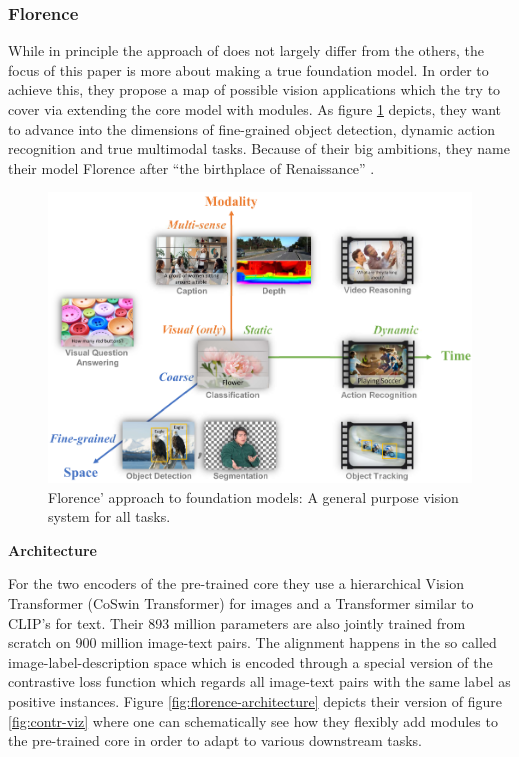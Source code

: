 \documentclass[
]{krantz}
\begin{document}
\hypertarget{florence}{%
\subsubsection{Florence}\label{florence}}

While in principle the approach of \citet{yuan2021florence} does not largely differ from the others, the focus of this paper is more about making a true foundation model.
In order to achieve this, they propose a map of possible vision applications which the try to cover via extending the core model with modules.
As figure \ref{fig:florence-dimensions} depicts, they want to advance into the dimensions of fine-grained object detection, dynamic action recognition and true multimodal tasks.
Because of their big ambitions, they name their model Florence after ``the birthplace of Renaissance'' \citep{yuan2021florence}.

\begin{figure}

{\centering \includegraphics[width=1\linewidth]{figures/02-04-text-support-img/florence-dimensions} 

}

\caption{Florence' approach to foundation models: A general purpose vision system for all tasks.}\label{fig:florence-dimensions}
\end{figure}



\textbf{Architecture}

For the two encoders of the pre-trained core they use a hierarchical Vision Transformer (CoSwin Transformer) for images and a Transformer similar to CLIP's for text.
Their 893 million parameters are also jointly trained from scratch on 900 million image-text pairs.
The alignment happens in the so called image-label-description space which is encoded through a special version of the contrastive loss function which regards all image-text pairs with the same label as positive instances.
Figure \ref{fig:florence-architecture} depicts their version of figure \ref{fig:contr-viz} where one can schematically see how they flexibly add modules to the pre-trained core in order to adapt to various downstream tasks.
\end{document}
